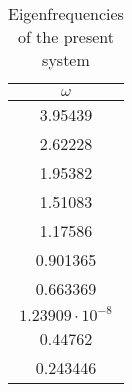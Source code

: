 \begin{table}[h]
    \centering
    \caption{Eigenfrequencies of the present system}
    \label{tab:freq}
    \begin{tabular}{c}
        \toprule
        $\omega$\\
        \midrule
        3.95439\\
        2.62228\\
        1.95382\\
        1.51083\\
        1.17586\\
        0.901365\\
        0.663369\\
        $1.23909\cdot10^{-8}$\\
        0.44762\\
        0.243446\\
        \bottomrule
    \end{tabular}
\end{table}
